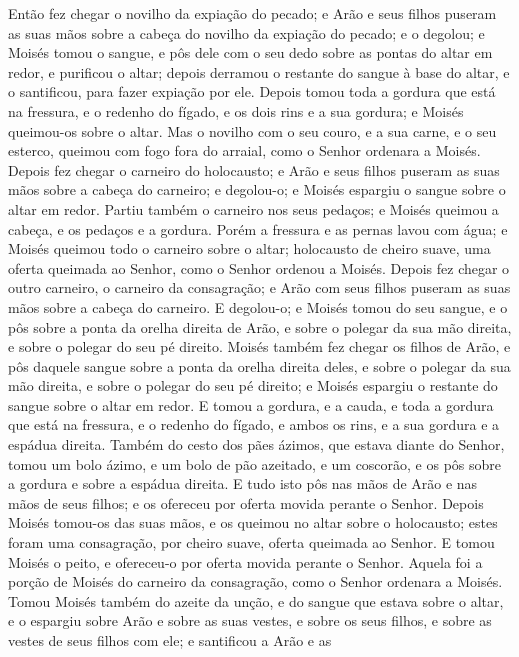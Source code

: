 Então fez chegar o novilho da expiação do pecado; e Arão e seus
filhos puseram as suas mãos sobre a cabeça do novilho da expiação do
pecado; e o degolou; e Moisés tomou o sangue, e pôs dele com
o seu dedo sobre as pontas do altar em redor, e purificou o altar;
depois derramou o restante do sangue à base do altar, e o
santificou, para fazer expiação por ele. Depois tomou toda a
gordura que está na fressura, e o redenho do fígado, e os dois rins
e a sua gordura; e Moisés queimou-os sobre o altar. Mas o
novilho com o seu couro, e a sua carne, e o seu esterco, queimou com
fogo fora do arraial, como o Senhor ordenara a Moisés. Depois
fez chegar o carneiro do holocausto; e Arão e seus filhos puseram as
suas mãos sobre a cabeça do carneiro; e degolou-o; e Moisés
espargiu o sangue sobre o altar em redor. Partiu também o
carneiro nos seus pedaços; e Moisés queimou a cabeça, e os pedaços e
a gordura. Porém a fressura e as pernas lavou com água; e
Moisés queimou todo o carneiro sobre o altar; holocausto de cheiro
suave, uma oferta queimada ao Senhor, como o Senhor ordenou a
Moisés. Depois fez chegar o outro carneiro, o carneiro da
consagração; e Arão com seus filhos puseram as suas mãos sobre a
cabeça do carneiro. E degolou-o; e Moisés tomou do seu
sangue, e o pôs sobre a ponta da orelha direita de Arão, e sobre o
polegar da sua mão direita, e sobre o polegar do seu pé direito.
Moisés também fez chegar os filhos de Arão, e pôs daquele
sangue sobre a ponta da orelha direita deles, e sobre o polegar da
sua mão direita, e sobre o polegar do seu pé direito; e Moisés
espargiu o restante do sangue sobre o altar em redor. E tomou
a gordura, e a cauda, e toda a gordura que está na fressura, e o
redenho do fígado, e ambos os rins, e a sua gordura e a espádua
direita. Também do cesto dos pães ázimos, que estava diante
do Senhor, tomou um bolo ázimo, e um bolo de pão azeitado, e um
coscorão, e os pôs sobre a gordura e sobre a espádua direita.
E tudo isto pôs nas mãos de Arão e nas mãos de seus filhos; e
os ofereceu por oferta movida perante o Senhor. Depois Moisés
tomou-os das suas mãos, e os queimou no altar sobre o holocausto;
estes foram uma consagração, por cheiro suave, oferta queimada ao
Senhor. E tomou Moisés o peito, e ofereceu-o por oferta
movida perante o Senhor. Aquela foi a porção de Moisés do carneiro
da consagração, como o Senhor ordenara a Moisés. Tomou Moisés
também do azeite da unção, e do sangue que estava sobre o altar, e o
espargiu sobre Arão e sobre as suas vestes, e sobre os seus filhos,
e sobre as vestes de seus filhos com ele; e santificou a Arão e as
